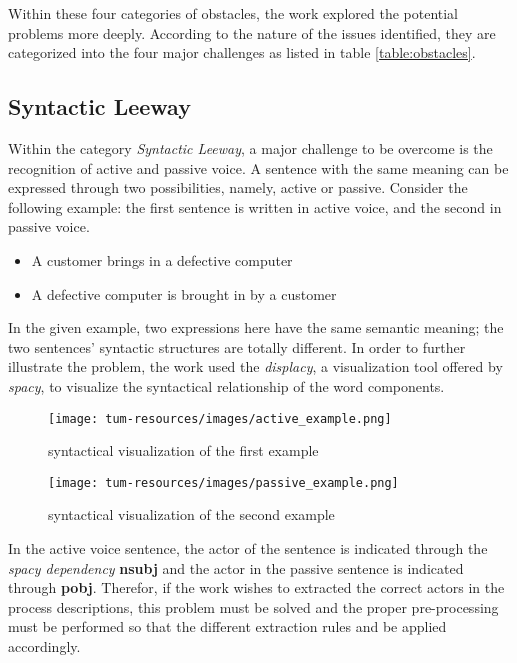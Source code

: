 Within these four categories of obstacles, the work explored the potential problems more deeply. According to the nature of the issues identified, they are categorized into the four major challenges as listed in table \ref{table:obstacles}. 

\subsection{Syntactic Leeway}
\label{sec:solution:syn_lee}
Within the category \textit{Syntactic Leeway}, a major challenge to be overcome is the recognition of active and passive voice. A sentence with the same meaning can be expressed through two possibilities, namely, active or passive. Consider the following example: the first sentence is written in active voice, and the second in passive voice. 

\begin{itemize}
    \item A customer brings in a defective computer
    \item A defective computer is brought in by a customer
\end{itemize}


In the given example, two expressions here have the same semantic meaning; the two sentences' syntactic structures are totally different. In order to further illustrate the problem, the work used the \textit{displacy}, a visualization tool offered by \textit{spacy}, to visualize the syntactical relationship of the word components.

\begin{figure}[h]
    \centering
    \caption{syntactical visualization of the first example}
    \texttt{[image: tum-resources/images/active\_example.png]}
\end{figure}

\begin{figure}[h]
    \centering
    \caption{syntactical visualization of the second example}
    \texttt{[image: tum-resources/images/passive\_example.png]}
\end{figure}

In the active voice sentence, the actor of the sentence is indicated through the \textit{spacy dependency} \textbf{nsubj} and the actor in the passive sentence is indicated through \textbf{pobj}. Therefor, if the work wishes to extracted the correct actors in the process descriptions, this problem must be solved and the proper pre-processing must be performed so that the different extraction rules and be applied accordingly.  

